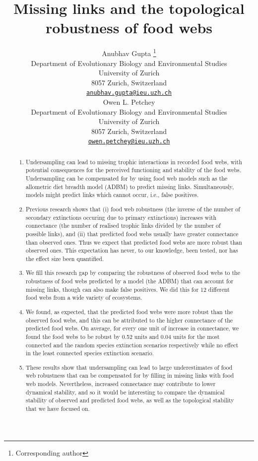 \documentclass{article}
\title{Missing links and the topological robustness of food webs}
\author{
    Anubhav Gupta
    \thanks{Corresponding author}
   \\
    Department of Evolutionary Biology and Environmental Studies \\
    University of Zurich \\
  8057 Zurich, Switzerland \\
  \texttt{\href{mailto:anubhav.gupta@ieu.uzh.ch}{\nolinkurl{anubhav.gupta@ieu.uzh.ch}}} \\
   \And
    Owen L. Petchey
   \\
    Department of Evolutionary Biology and Environmental Studies \\
    University of Zurich \\
  8057 Zurich, Switzerland \\
  \texttt{\href{mailto:owen.petchey@ieu.uzh.ch}{\nolinkurl{owen.petchey@ieu.uzh.ch}}} \\
  }
\providecommand{\tightlist}{%
  \setlength{\itemsep}{0pt}\setlength{\parskip}{0pt}}
\begin{document}
\maketitle


\begin{abstract}
\begin{enumerate}
\def\labelenumi{\arabic{enumi})}
\tightlist
\item
  Undersampling can lead to missing trophic interactions in recorded
  food webs, with potential consequences for the perceived functioning
  and stability of the food webs. Undersampling can be compensated for
  by using food web models such as the allometric diet breadth model
  (ADBM) to predict missing links. Simultaneously, models might predict
  links which cannot occur, i.e., false positives.
\item
  Previous research shows that (i) food web robustness (the inverse of
  the number of secondary extinctions occuring due to primary
  extinctions) increases with connectance (the number of realised
  trophic links divided by the number of possible links), and (ii) that
  predicted food webs usually have greater connectance than observed
  ones. Thus we expect that predicted food webs are more robust than
  observed ones. This expectation has never, to our knowledge, been
  tested, nor has the effect size been quantified.
\item
  We fill this research gap by comparing the robustness of observed food
  webs to the robustness of food webs predicted by a model (the ADBM)
  that can account for missing links, though can also make false
  positives. We did this for 12 different food webs from a wide variety
  of ecosystems.
\item
  We found, as expected, that the predicted food webs were more robust
  than the observed food webs, and this can be attributed to the higher
  connectance of the predicted food webs. On average, for every one unit
  of increase in connectance, we found the food webs to be robust by
  0.52 units and 0.04 units for the most connected and the random
  species extinction scenarios respectively while no effect in the least
  connected species extinction scenario.
\item
  These results show that undersampling can lead to large underestimates
  of food web robustness that can be compensated for by filling in
  missing links with food web models. Nevertheless, increased
  connectance may contribute to lower dynamical stability, and so it
  would be interesting to compare the dynamical stability of observed
  and predicted food webs, as well as the topological stability that we
  have focused on.
\end{enumerate}
\end{abstract}
\end{document}
